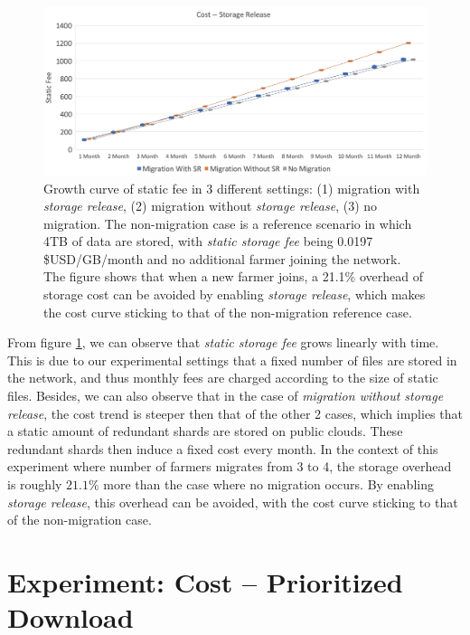 \begin{figure}[hbt]
  \centering
    \includegraphics[width=14cm]{charts/chart_cost_storage_release.png}
    \caption[Growth curve of static fee in 3 different settings: (1) migration with \textit{storage release}, (2) migration without \textit{storage release}, (3) no migration]{Growth curve of static fee in 3 different settings: (1) migration with \textit{storage release}, (2) migration without \textit{storage release}, (3) no migration. The non-migration case is a reference scenario in which 4TB of data are stored, with \textit{static storage fee} being 0.0197 \$USD/GB/month and no additional farmer joining the network. The figure shows that when a new farmer joins, a 21.1\% overhead of storage cost can be avoided by enabling \textit{storage release}, which makes the cost curve sticking to that of the non-migration reference case.}
    \label{fig:coststoragerelease}
\end{figure}

From figure \ref{fig:coststoragerelease}, we can observe that \textit{static storage fee} grows linearly with time. This is due to our experimental settings that a fixed number of files are stored in the network, and thus monthly fees are charged according to the size of static files. Besides, we can also observe that in the case of \textit{migration without storage release}, the cost trend is steeper then that of the other 2 cases, which implies that a static amount of redundant shards are stored on public clouds. These redundant shards then induce a fixed cost every month. In the context of this experiment where number of farmers migrates from 3 to 4, the storage overhead is roughly $21.1\%$ more than the case where no migration occurs. By enabling \textit{storage release}, this overhead can be avoided, with the cost curve sticking to that of the non-migration case.

\section{Experiment: Cost -- Prioritized Download}
\label{s:expcostprioritizeddownload}

